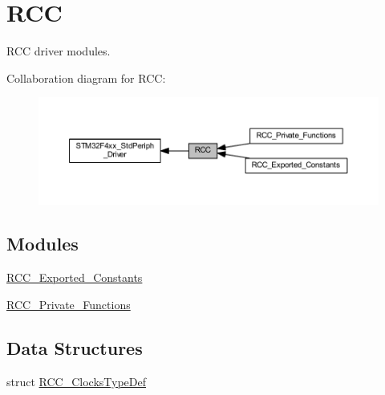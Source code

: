 \hypertarget{group___r_c_c}{}\section{R\+CC}
\label{group___r_c_c}


R\+CC driver modules.  


Collaboration diagram for R\+CC\+:
\nopagebreak
\begin{figure}[H]
\begin{center}
\leavevmode
\includegraphics[width=350pt]{group___r_c_c}
\end{center}
\end{figure}
\subsection*{Modules}
\begin{DoxyCompactItemize}
\item 
\hyperlink{group___r_c_c___exported___constants}{R\+C\+C\+\_\+\+Exported\+\_\+\+Constants}
\item 
\hyperlink{group___r_c_c___private___functions}{R\+C\+C\+\_\+\+Private\+\_\+\+Functions}
\end{DoxyCompactItemize}
\subsection*{Data Structures}
\begin{DoxyCompactItemize}
\item 
struct \hyperlink{struct_r_c_c___clocks_type_def}{R\+C\+C\+\_\+\+Clocks\+Type\+Def}
\end{DoxyCompactItemize}
